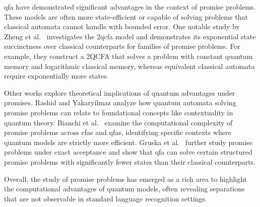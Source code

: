 \gls{qfa} have demonstrated significant advantages in the context of promise problems. These models are often more state-efficient or capable of solving problems that classical automata cannot handle with bounded error. One notable study by Zheng et al.\ \cite{zheng2013state} investigates the \gls{2qcfa} model and demonstrates its exponential state succinctness over classical counterparts for families of promise problems. For example, they construct a 2QCFA that solves a problem with constant quantum memory and logarithmic classical memory, whereas equivalent classical automata require exponentially more states.

Other works explore theoretical implications of quantum advantages under promises. Rashid and Yakaryilmaz \cite{rashid2014implications} analyze how quantum automata solving promise problems can relate to foundational concepts like contextuality in quantum theory. Bianchi et al.\ \cite{bianchi2014complexity} examine the computational complexity of promise problems across \glspl{cfa} and \glspl{qfa}, identifying specific contexts where quantum models are strictly more efficient. Gruska et al.\ \cite{gruska2015potential} further study promise problems under exact acceptance and show that \gls{qfa} can solve certain structured promise problems with significantly fewer states than their classical counterparts. 

Overall, the study of promise problems has emerged as a rich area to highlight the computational advantages of quantum models, often revealing separations that are not observable in standard language recognition settings.